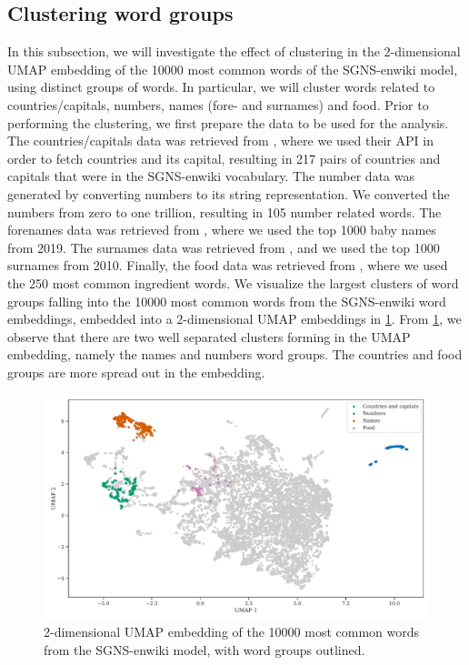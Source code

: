 \subsection{Clustering word groups}
\label{sec:clustering-word-groups}
In this subsection, we will investigate the effect of clustering in the 2-dimensional UMAP embedding of the 10000 most common words of the SGNS-enwiki model, using distinct groups of words. In particular, we will cluster words related to countries/capitals, numbers, names (fore- and surnames) and food. Prior to performing the clustering, we first prepare the data to be used for the analysis. The countries/capitals data was retrieved from \cite{GeoNames}, where we used their API in order to fetch countries and its capital, resulting in 217 pairs of countries and capitals that were in the SGNS-enwiki vocabulary. The number data was generated by converting numbers to its string representation. We converted the numbers from zero to one trillion, resulting in 105 number related words. The forenames data was retrieved from \cite{SSABabyNames}, where we used the top 1000 baby names from 2019. The surnames data was retrieved from \cite{CensusSurnames}, and we used the top 1000 surnames from 2010. Finally, the food data was retrieved from \cite{FoodIngredientList}, where we used the 250 most common ingredient words. We visualize the largest clusters of word groups falling into the 10000 most common words from the SGNS-enwiki word embeddings, embedded into a 2-dimensional UMAP embeddings in \cref{fig:word-cluster-all-groups}. From \cref{fig:word-cluster-all-groups}, we observe that there are two well separated clusters forming in the UMAP embedding, namely the names and numbers word groups. The countries and food groups are more spread out in the embedding.
\begin{figure}[H]
    \centering
    \includegraphics[width=\textwidth]{thesis/figures/word-cluster-all-groups.pdf}
    \caption{2-dimensional UMAP embedding of the 10000 most common words from the SGNS-enwiki model, with word groups outlined.}
    \label{fig:word-cluster-all-groups}
\end{figure}

